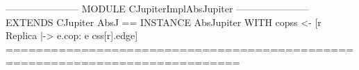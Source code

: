 \documentclass{article}
\begin{document}
\begin{tla}
----------------------- MODULE CJupiterImplAbsJupiter -----------------------
EXTENDS CJupiter
AbsJ == INSTANCE AbsJupiter
            WITH copss <- [r \in Replica |-> {e.cop: e \in css[r].edge}]
=============================================================================
\end{tla}
\end{document}
